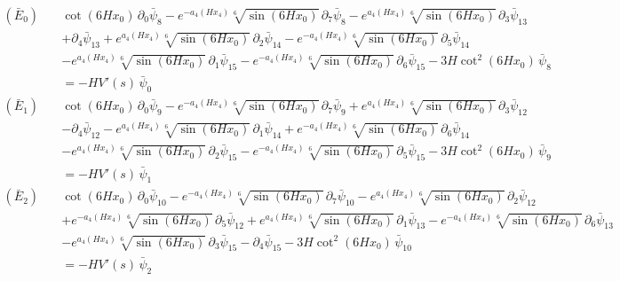 \begin{align*}
(\bar E_{0})\quad & \cot \left(6 H x_0\right)\,\partial_{0}\bar\psi_{8} - e^{-a_4\left(H x_4\right)} \sqrt[6]{\sin \left(6 H x_0\right)}\,\partial_{7}\bar\psi_{8} - e^{a_4\left(H x_4\right)} \sqrt[6]{\sin \left(6 H x_0\right)}\,\partial_{3}\bar\psi_{13} \\
 &  + \partial_{4}\bar\psi_{13} + e^{a_4\left(H x_4\right)} \sqrt[6]{\sin \left(6 H x_0\right)}\,\partial_{2}\bar\psi_{14} - e^{-a_4\left(H x_4\right)} \sqrt[6]{\sin \left(6 H x_0\right)}\,\partial_{5}\bar\psi_{14} \\
 &  - e^{a_4\left(H x_4\right)} \sqrt[6]{\sin \left(6 H x_0\right)}\,\partial_{1}\bar\psi_{15} - e^{-a_4\left(H x_4\right)} \sqrt[6]{\sin \left(6 H x_0\right)}\,\partial_{6}\bar\psi_{15} - 3 H \cot ^2\left(6 H x_0\right)\,\bar\psi_{8} \\
 & = -H V'(s)\,\bar\psi_{0}
\end{align*}
\begin{align*}
(\bar E_{1})\quad & \cot \left(6 H x_0\right)\,\partial_{0}\bar\psi_{9} - e^{-a_4\left(H x_4\right)} \sqrt[6]{\sin \left(6 H x_0\right)}\,\partial_{7}\bar\psi_{9} + e^{a_4\left(H x_4\right)} \sqrt[6]{\sin \left(6 H x_0\right)}\,\partial_{3}\bar\psi_{12} \\
 &  - \partial_{4}\bar\psi_{12} - e^{a_4\left(H x_4\right)} \sqrt[6]{\sin \left(6 H x_0\right)}\,\partial_{1}\bar\psi_{14} + e^{-a_4\left(H x_4\right)} \sqrt[6]{\sin \left(6 H x_0\right)}\,\partial_{6}\bar\psi_{14} \\
 &  - e^{a_4\left(H x_4\right)} \sqrt[6]{\sin \left(6 H x_0\right)}\,\partial_{2}\bar\psi_{15} - e^{-a_4\left(H x_4\right)} \sqrt[6]{\sin \left(6 H x_0\right)}\,\partial_{5}\bar\psi_{15} - 3 H \cot ^2\left(6 H x_0\right)\,\bar\psi_{9} \\
 & = -H V'(s)\,\bar\psi_{1}
\end{align*}
\begin{align*}
(\bar E_{2})\quad & \cot \left(6 H x_0\right)\,\partial_{0}\bar\psi_{10} - e^{-a_4\left(H x_4\right)} \sqrt[6]{\sin \left(6 H x_0\right)}\,\partial_{7}\bar\psi_{10} - e^{a_4\left(H x_4\right)} \sqrt[6]{\sin \left(6 H x_0\right)}\,\partial_{2}\bar\psi_{12} \\
 &  + e^{-a_4\left(H x_4\right)} \sqrt[6]{\sin \left(6 H x_0\right)}\,\partial_{5}\bar\psi_{12} + e^{a_4\left(H x_4\right)} \sqrt[6]{\sin \left(6 H x_0\right)}\,\partial_{1}\bar\psi_{13} - e^{-a_4\left(H x_4\right)} \sqrt[6]{\sin \left(6 H x_0\right)}\,\partial_{6}\bar\psi_{13} \\
 &  - e^{a_4\left(H x_4\right)} \sqrt[6]{\sin \left(6 H x_0\right)}\,\partial_{3}\bar\psi_{15} - \partial_{4}\bar\psi_{15} - 3 H \cot ^2\left(6 H x_0\right)\,\bar\psi_{10} \\
 & = -H V'(s)\,\bar\psi_{2}
\end{align*}
